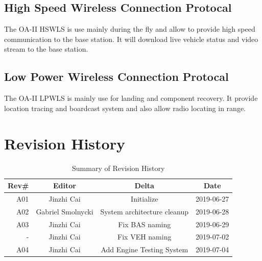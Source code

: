 \documentclass[12pt,article]{memoir}
\begin{document}
\section{High Speed Wireless Connection Protocal}
The OA-II HSWLS is use mainly during the fly and allow to provide high speed communication to the base station. It will download live vehicle status and video stream to the base station.
\section{Low Power Wireless Connection Protocal}
The OA-II LPWLS is mainly use for landing and component recovery. It provide location tracing and boardcast system and also allow radio locating in range.

\chapter{Revision History}
\begin{table}[H]
	\centering
	\begin{tabu}{r || c | c | c }
		Rev\# & Editor & Delta & Date\\ \hline
		A01 & Jinzhi Cai & Initialize  & 2019-06-27\\ \hline
		A02 & Gabriel Smolnycki & System architecture cleanup  & 2019-06-28\\ \hline
		A03 & Jinzhi Cai & Fix BAS naming  & 2019-06-29\\
		- & Jinzhi Cai & Fix VEH naming  & 2019-07-02\\ \hline
		A04 & Jinzhi Cai & Add Engine Testing System  & 2019-07-04\\ \hline
	\end{tabu}
	\caption{Summary of Revision History}
	\label{tab:edatools}
\end{table}
\end{document}
